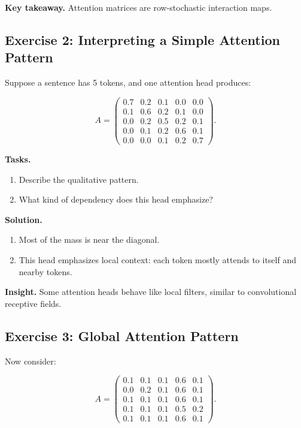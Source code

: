 \medskip

\noindent
\textbf{Key takeaway.}  
Attention matrices are row-stochastic interaction maps.

\subsection{Exercise 2: Interpreting a Simple Attention Pattern}

Suppose a sentence has 5 tokens, and one attention head produces:

\[
A =
\begin{pmatrix}
0.7 & 0.2 & 0.1 & 0.0 & 0.0 \\
0.1 & 0.6 & 0.2 & 0.1 & 0.0 \\
0.0 & 0.2 & 0.5 & 0.2 & 0.1 \\
0.0 & 0.1 & 0.2 & 0.6 & 0.1 \\
0.0 & 0.0 & 0.1 & 0.2 & 0.7
\end{pmatrix}.
\]

\medskip

\noindent
\textbf{Tasks.}
\begin{enumerate}
    \item Describe the qualitative pattern.
    \item What kind of dependency does this head emphasize?
\end{enumerate}

\medskip

\noindent
\textbf{Solution.}

\begin{enumerate}
    \item Most of the mass is near the diagonal.

    \item This head emphasizes local context: each token mostly attends to itself and nearby tokens.
\end{enumerate}

\medskip

\noindent
\textbf{Insight.}  
Some attention heads behave like local filters, similar to convolutional receptive fields.

\subsection{Exercise 3: Global Attention Pattern}

Now consider:

\[
A =
\begin{pmatrix}
0.1 & 0.1 & 0.1 & 0.6 & 0.1 \\
0.0 & 0.2 & 0.1 & 0.6 & 0.1 \\
0.1 & 0.1 & 0.1 & 0.6 & 0.1 \\
0.1 & 0.1 & 0.1 & 0.5 & 0.2 \\
0.1 & 0.1 & 0.1 & 0.6 & 0.1
\end{pmatrix}.
\]

